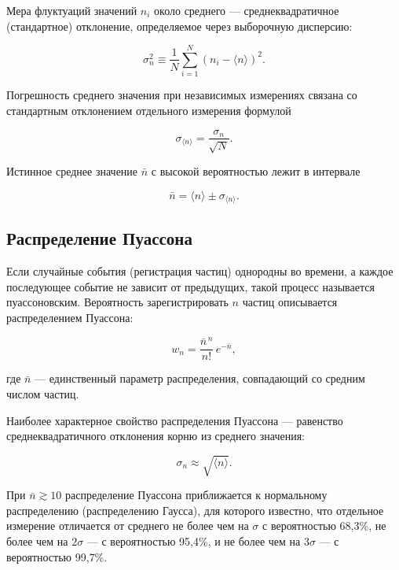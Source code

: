 \documentclass[12pt,a4paper]{article}
\begin{document}
Мера флуктуаций значений $n_i$ около среднего — среднеквадратичное (стандартное) отклонение, определяемое через выборочную дисперсию:

\begin{equation}
    \sigma_n^2 \equiv \frac{1}{N}\sum_{i=1}^{N}(n_i - \langle n\rangle)^2.
    \label{eq:variance}
\end{equation}

Погрешность среднего значения при независимых измерениях связана со стандартным отклонением отдельного измерения формулой

\begin{equation}
    \sigma_{\langle n\rangle} = \frac{\sigma_n}{\sqrt{N}}.
    \label{eq:mean_error}
\end{equation}

Истинное среднее значение $\bar n$ с высокой вероятностью лежит в интервале

\begin{equation}
    \bar n = \langle n\rangle \pm \sigma_{\langle n\rangle}.
    \label{eq:final_result}
\end{equation}

\subsection*{Распределение Пуассона}

Если случайные события (регистрация частиц) однородны во времени, а каждое последующее событие не зависит от предыдущих, такой процесс называется пуассоновским. Вероятность зарегистрировать $n$ частиц описывается распределением Пуассона:

\begin{equation}
    w_n = \frac{\bar n^{\,n}}{n!}\,e^{-\bar n},
    \label{eq:poisson}
\end{equation}

где $\bar n$ — единственный параметр распределения, совпадающий со средним числом частиц.

Наиболее характерное свойство распределения Пуассона — равенство среднеквадратичного отклонения корню из среднего значения:

\begin{equation}
    \sigma_n \approx \sqrt{\langle n\rangle}.
    \label{eq:poisson_property}
\end{equation}

При $\bar n \gtrsim 10$ распределение Пуассона приближается к нормальному распределению (распределению Гаусса), для которого известно, что отдельное измерение отличается от среднего не более чем на $\sigma$ с вероятностью 68{,}3\%, не более чем на $2\sigma$ — с вероятностью 95{,}4\%, и не более чем на $3\sigma$ — с вероятностью 99{,}7\%.
\end{document}
